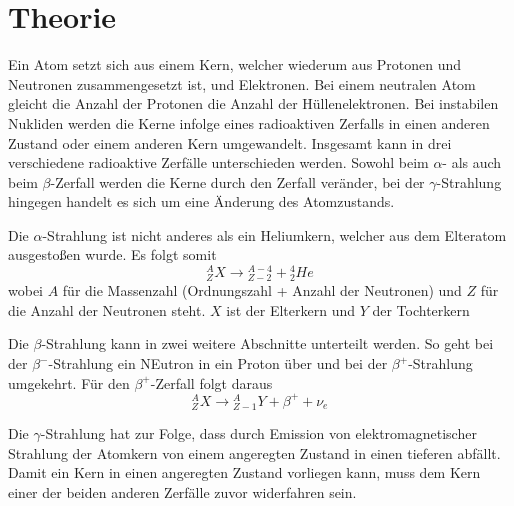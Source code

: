 \section{Theorie}
\label{sec:Theorie}

Ein Atom setzt sich aus einem Kern, welcher wiederum aus Protonen und Neutronen zusammengesetzt ist, und Elektronen.
Bei einem neutralen Atom gleicht die Anzahl der Protonen die Anzahl der Hüllenelektronen. Bei instabilen Nukliden werden die Kerne infolge eines radioaktiven
Zerfalls in einen anderen Zustand oder einem anderen Kern umgewandelt. Insgesamt kann in drei verschiedene radioaktive Zerfälle unterschieden werden.
Sowohl beim $\alpha$- als auch beim $\beta$-Zerfall werden die Kerne durch den Zerfall veränder, bei der $\gamma$-Strahlung hingegen handelt es sich um eine Änderung
des Atomzustands.

Die $\alpha$-Strahlung ist nicht anderes als ein Heliumkern, welcher aus dem Elteratom ausgestoßen wurde.
Es folgt somit
\begin{equation*}
    { }_Z^A X \longrightarrow{ }_{Z-2}^{A-4}+{ }_2^4He
\end{equation*}
wobei $ A$ für die Massenzahl (Ordnungszahl + Anzahl der Neutronen) und $Z$ für die Anzahl der Neutronen steht. $X$ ist der Elterkern und $Y$ der Tochterkern

Die $\beta$-Strahlung kann in zwei weitere Abschnitte unterteilt werden. So geht bei der $\beta^-$-Strahlung ein NEutron in ein Proton über und bei der $\beta^+$-Strahlung umgekehrt.
Für den $\beta^+$-Zerfall folgt daraus
\begin{equation*}
    { }_Z^A X \longrightarrow{ }_{Z-1}^A Y+\beta^{+}+\nu_e
\end{equation*}

Die $\gamma$-Strahlung hat zur Folge, dass durch Emission von elektromagnetischer Strahlung der Atomkern von einem angeregten Zustand in einen tieferen abfällt. Damit ein Kern in einen
angeregten Zustand vorliegen kann, muss dem Kern einer der beiden anderen Zerfälle zuvor widerfahren sein.

